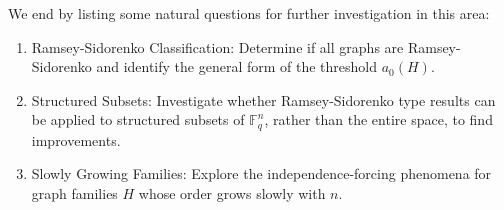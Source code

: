 \documentclass[12pt]{article}
\newcommand{\Fq}{\mathbb{F}_q}
\begin{document}
We end by listing some natural questions for further investigation in this area:
\begin{enumerate}

   \item  Ramsey-Sidorenko Classification: Determine if all graphs are Ramsey-Sidorenko and identify the general form of the threshold $a_0(H)$.
    \item Structured Subsets: Investigate whether Ramsey-Sidorenko type results can be applied to structured subsets of $\Fq^n$, rather than the entire space, to find improvements.
    \item Slowly Growing Families: Explore the independence-forcing phenomena for graph families $H$ whose order grows slowly with $n$.
\end{enumerate}

\end{document}
